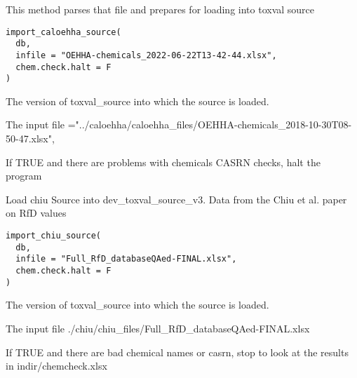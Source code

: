 \documentclass[letterpaper]{book}
\begin{document}
%
\begin{Description}\relax
This method parses that file and prepares for loading into toxval source
\end{Description}
%
\begin{Usage}
\begin{verbatim}
import_caloehha_source(
  db,
  infile = "OEHHA-chemicals_2022-06-22T13-42-44.xlsx",
  chem.check.halt = F
)
\end{verbatim}
\end{Usage}
%
\begin{Arguments}
\begin{ldescription}
\item[\code{db}] The version of toxval\_source into which the source is loaded.

\item[\code{infile}] The input file ="../caloehha/caloehha\_files/OEHHA-chemicals\_2018-10-30T08-50-47.xlsx",

\item[\code{chem.check.halt}] If TRUE and there are problems with chemicals CASRN checks, halt the program
\end{ldescription}
\end{Arguments}
%
\begin{Description}\relax
Load chiu Source into dev\_toxval\_source\_v3.
Data from the Chiu et al. paper on RfD values
\end{Description}
%
\begin{Usage}
\begin{verbatim}
import_chiu_source(
  db,
  infile = "Full_RfD_databaseQAed-FINAL.xlsx",
  chem.check.halt = F
)
\end{verbatim}
\end{Usage}
%
\begin{Arguments}
\begin{ldescription}
\item[\code{db}] The version of toxval\_source into which the source is loaded.

\item[\code{infile}] The input file ./chiu/chiu\_files/Full\_RfD\_databaseQAed-FINAL.xlsx

\item[\code{chem.check.halt}] If TRUE and there are bad chemical names or casrn,
stop to look at the results in indir/chemcheck.xlsx
\end{ldescription}
\end{Arguments}
\end{document}
